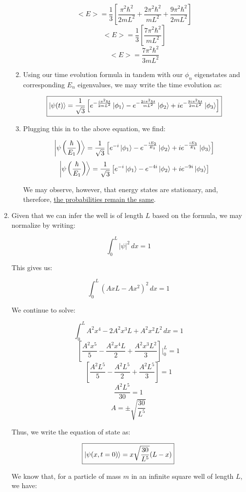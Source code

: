 \begin{enumerate}
\begin{enumerate}
        $$<E>=\frac{1}{3}\left[ \frac{\pi^2\hbar^2}{2mL^2}+\frac{2\pi^2\hbar^2}{mL^2}+\frac{9\pi^2\hbar^2}{2mL^2} \right]$$
        $$<E>=\frac{1}{3}\left[ \frac{7\pi^2\hbar^2}{mL^2} \right]$$
        $$\boxed{<E>=\frac{7\pi^2\hbar^2}{3mL^2} }$$

      \item Using our time evolution formula in tandem with our $\phi_n$ eigenstates and corresponding $E_n$ eigenvalues, we may write the time evolution as:

        $$\boxed{\ket{\psi(t)}=\frac{1}{\sqrt{3}}\left[e^{-\frac{i\pi^2\hbar t}{2mL^2}}\ket{\phi_1}-e^{-\frac{2i\pi^2\hbar t}{mL^2}}\ket{\phi_2}+ie^{-\frac{9i\pi^2\hbar t}{2mL^2}}\ket{\phi_3}\right]}$$

      \item Plugging this in to the above equation, we find:

        $$\ket{\psi\left( \frac{\hbar}{E_1} \right)}=\frac{1}{\sqrt{3}}\left[e^{-i}\ket{\phi_1}-e^{-\frac{iE_2}{E_1}}\ket{\phi_2}+ie^{-\frac{iE_3}{E_1}}\ket{\phi_3}\right]$$
        $$\ket{\psi\left( \frac{\hbar}{E_1} \right)}=\frac{1}{\sqrt{3}}\left[e^{-i}\ket{\phi_1}-e^{-4i}\ket{\phi_2}+ie^{-9i}\ket{\phi_3}\right]$$

        We may observe, however, that energy states are stationary, and, therefore, \underline{the probabilities remain the same}.

    \end{enumerate}

  \item Given that we can infer the well is of length $L$ based on the formula, we may normalize by writing:

    $$\int_0^L |\psi|^2\,dx=1$$

    This gives us:

    $$\int_0^L (AxL-Ax^2)^2\,dx=1$$

    We continue to solve:

    $$\int_0^L A^2x^4-2A^2x^3L+A^2x^2L^2\,dx=1$$
    $$\left[\frac{A^2x^5}{5}-\frac{A^2x^4L}{2}+\frac{A^2x^3L^2}{3}\right]\Big|_0^L=1$$
    $$\left[\frac{A^2L^5}{5}-\frac{A^2L^5}{2}+\frac{A^2L^5}{3}\right]=1$$
    $$\frac{A^2L^5}{30}=1$$
    $$\boxed{A=\pm\sqrt{\frac{30}{L^5}}}$$

    Thus, we write the equation of state as:

    $$\boxed{\ket{\psi(x,t=0)}=x\sqrt{\frac{30}{L^5}}(L-x)}$$

    We know that, for a particle of mass $m$ in an infinite square well of length $L$, we have:


\end{enumerate}
